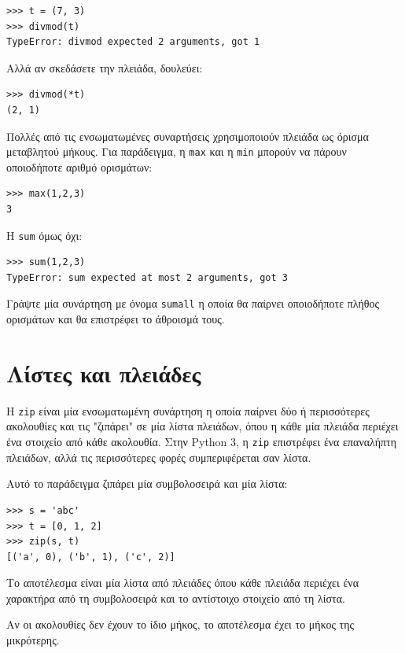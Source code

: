 \documentclass[10pt]{book}
\begin{document}
\begin{verbatim}
>>> t = (7, 3)
>>> divmod(t)
TypeError: divmod expected 2 arguments, got 1
\end{verbatim}
%
Αλλά αν σκεδάσετε την πλειάδα, δουλεύει:

\begin{verbatim}
>>> divmod(*t)
(2, 1)
\end{verbatim}
%
\begin{exercise}

Πολλές από τις ενσωματωμένες συναρτήσεις χρησιμοποιούν πλειάδα ως όρισμα μεταβλητού μήκους. Για παράδειγμα, η {\tt max} και η {\tt min} μπορούν να πάρουν οποιοδήποτε αριθμό ορισμάτων:

\begin{verbatim}
>>> max(1,2,3)
3
\end{verbatim}
%
Η {\tt sum} όμως όχι:

\begin{verbatim}
>>> sum(1,2,3)
TypeError: sum expected at most 2 arguments, got 3
\end{verbatim}
%
Γράψτε μία συνάρτηση με όνομα {\tt sumall} η οποία θα παίρνει οποιοδήποτε πλήθος ορισμάτων και θα επιστρέφει το άθροισμά τους.
\end{exercise}


\section{Λίστες και πλειάδες}

Η {\tt zip} είναι μία ενσωματωμένη συνάρτηση η οποία παίρνει δύο ή περισσότερες ακολουθίες και τις "ζιπάρει" σε μία λίστα πλειάδων, όπου η κάθε μία πλειάδα περιέχει ένα στοιχείο από κάθε ακολουθία. Στην Python 3, η {\tt zip} επιστρέφει ένα επαναλήπτη πλειάδων, αλλά τις περισσότερες φορές συμπεριφέρεται σαν λίστα.

Αυτό το παράδειγμα ζιπάρει μία συμβολοσειρά και μία λίστα:

\begin{verbatim}
>>> s = 'abc'
>>> t = [0, 1, 2]
>>> zip(s, t)
[('a', 0), ('b', 1), ('c', 2)]
\end{verbatim}
%
Το αποτέλεσμα είναι μία λίστα από πλειάδες όπου κάθε πλειάδα περιέχει ένα χαρακτήρα από τη συμβολοσειρά και το αντίστοιχο στοιχείο από τη λίστα.

Αν οι ακολουθίες δεν έχουν το ίδιο μήκος, το αποτέλεσμα έχει το μήκος της μικρότερης.
\end{document}
